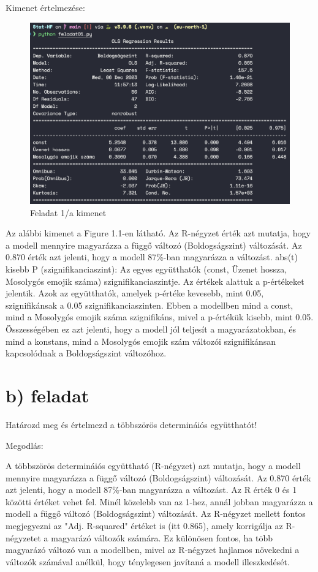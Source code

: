 \documentclass[11pt,a4paper,oneside]{report}
\begin{document}
Kimenet értelmezése:
\begin{figure}[!ht]
  \begin{center}
    \includegraphics[scale=0.4]{1.1.png}
    \caption{Feladat 1/a kimenet}
    \label{fig:TexnicCenter}
  \end{center}
\end{figure}
Az alábbi kimenet a Figure 1.1-en látható. Az R-négyzet érték azt mutatja, hogy a modell mennyire magyarázza a függő változó (Boldogságszint) változását. Az 0.870 érték azt jelenti, hogy a modell 87\%-ban magyarázza a változást.
abs(t) kisebb P (szignifikanciaszint): Az egyes együtthatók (const, Üzenet hossza, Mosolygós emojik száma) szignifikanciaszintje. Az értékek alattuk a p-értékeket jelentik. Azok az együtthatók, amelyek p-értéke kevesebb, mint 0.05, szignifikánsak a 0.05 szignifikanciaszinten. Ebben a modellben mind a const, mind a Mosolygós emojik száma szignifikáns, mivel a p-értékük kisebb, mint 0.05.
Összességében ez azt jelenti, hogy a modell jól teljesít a magyarázatokban, és mind a konstans, mind a Mosolygós emojik szám változói szignifikánsan kapcsolódnak a Boldogságszint változóhoz.
\section{b) feladat}
Határozd meg és értelmezd a többszörös determináiós együtthatót!

Megodlás:

A többszörös determináiós együttható (R-négyzet) azt mutatja, hogy a modell mennyire magyarázza a függő változó (Boldogságszint) változását. Az 0.870 érték azt jelenti, hogy a modell 87\%-ban magyarázza a változást.
Az R érték 0 és 1 közötti értéket vehet fel. Minél közelebb van az 1-hez, annál jobban magyarázza a modell a függő változó (Boldogságszint) változását.
Az R-négyzet mellett fontos megjegyezni az "Adj. R-squared" értéket is (itt 0.865), amely korrigálja az R-négyzetet a magyarázó változók számára. Ez különösen fontos, ha több magyarázó változó van a modellben, mivel az R-négyzet hajlamos növekedni a változók számával anélkül, hogy ténylegesen javítaná a modell illeszkedését.
\end{document}
